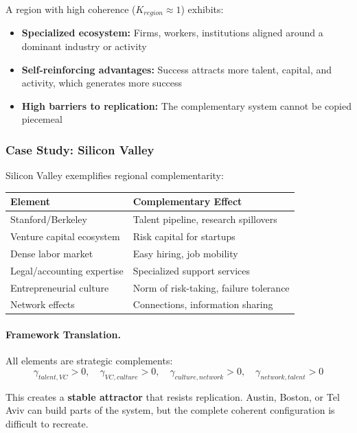 A region with high coherence ($K_{region} \approx 1$) exhibits:
\begin{itemize}
    \item \textbf{Specialized ecosystem:} Firms, workers, institutions aligned
          around a dominant industry or activity
    \item \textbf{Self-reinforcing advantages:} Success attracts more talent,
          capital, and activity, which generates more success
    \item \textbf{High barriers to replication:} The complementary system cannot
          be copied piecemeal
\end{itemize}

\subsubsection{Case Study: Silicon Valley}

Silicon Valley exemplifies regional complementarity:

\begin{center}
\renewcommand{\arraystretch}{1.3}
\begin{tabular}{|l|l|}
\hline
\textbf{Element} & \textbf{Complementary Effect} \\
\hline
Stanford/Berkeley & Talent pipeline, research spillovers \\
Venture capital ecosystem & Risk capital for startups \\
Dense labor market & Easy hiring, job mobility \\
Legal/accounting expertise & Specialized support services \\
Entrepreneurial culture & Norm of risk-taking, failure tolerance \\
Network effects & Connections, information sharing \\
\hline
\end{tabular}
\end{center}

\paragraph{Framework Translation.}
All elements are strategic complements:
\begin{equation}
\gamma_{talent,VC} > 0, \quad \gamma_{VC,culture} > 0, \quad
\gamma_{culture,network} > 0, \quad \gamma_{network,talent} > 0
\end{equation}

This creates a \textbf{stable attractor} that resists replication. Austin, Boston,
or Tel Aviv can build parts of the system, but the complete coherent configuration
is difficult to recreate.

